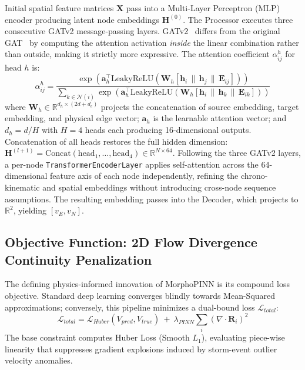 \documentclass[conference]{IEEEtran}
\begin{document}
Initial spatial feature matrices $\mathbf{X}$ pass into a Multi-Layer Perceptron (MLP) encoder producing latent node embeddings $\mathbf{H}^{(0)}$. The Processor executes three consecutive GATv2 message-passing layers. GATv2~\cite{brody2022attentive} differs from the original GAT~\cite{velivckovic2018graph} by computing the attention activation \textit{inside} the linear combination rather than outside, making it strictly more expressive. The attention coefficient $\alpha_{ij}^h$ for head $h$ is:
\begin{equation}
    \alpha_{ij}^h = \frac{\exp\left(\mathbf{a}_h^\top \text{LeakyReLU}\left(\mathbf{W}_h [\mathbf{h}_i \,\|\, \mathbf{h}_j \,\|\, \mathbf{E}_{ij}]\right)\right)}{\sum_{k \in \mathcal{N}(i)} \exp\left(\mathbf{a}_h^\top \text{LeakyReLU}\left(\mathbf{W}_h [\mathbf{h}_i \,\|\, \mathbf{h}_k \,\|\, \mathbf{E}_{ik}]\right)\right)}
\end{equation}
where $\mathbf{W}_h \in \mathbb{R}^{d_h \times (2d + d_e)}$ projects the concatenation of source embedding, target embedding, and physical edge vector; $\mathbf{a}_h$ is the learnable attention vector; and $d_h = d/H$ with $H=4$ heads each producing 16-dimensional outputs. Concatenation of all heads restores the full hidden dimension: $\mathbf{H}^{(l+1)} = \text{Concat}(\text{head}_1, \dots, \text{head}_4) \in \mathbb{R}^{N \times 64}$. Following the three GATv2 layers, a per-node \texttt{TransformerEncoderLayer} applies self-attention across the 64-dimensional feature axis of each node independently, refining the chrono-kinematic and spatial embeddings without introducing cross-node sequence assumptions. The resulting embedding passes into the Decoder, which projects to $\mathbb{R}^2$, yielding $[v_E, v_N]$.

\subsection{Objective Function: 2D Flow Divergence Continuity Penalization}
The defining physics-informed innovation of MorphoPINN is its compound loss objective. Standard deep learning converges blindly towards Mean-Squared approximations; conversely, this pipeline minimizes a dual-bound loss $\mathcal{L}_{total}$:
\begin{equation}
    \mathcal{L}_{total} = \mathcal{L}_{Huber}(V_{pred}, V_{true}) \ + \ \lambda_{PINN} \sum_{i} \left( \nabla \cdot \mathbf{R}_i \right)^2
\end{equation}
The base constraint computes Huber Loss (Smooth $L_1$), evaluating piece-wise linearity that suppresses gradient explosions induced by storm-event outlier velocity anomalies.
\end{document}
